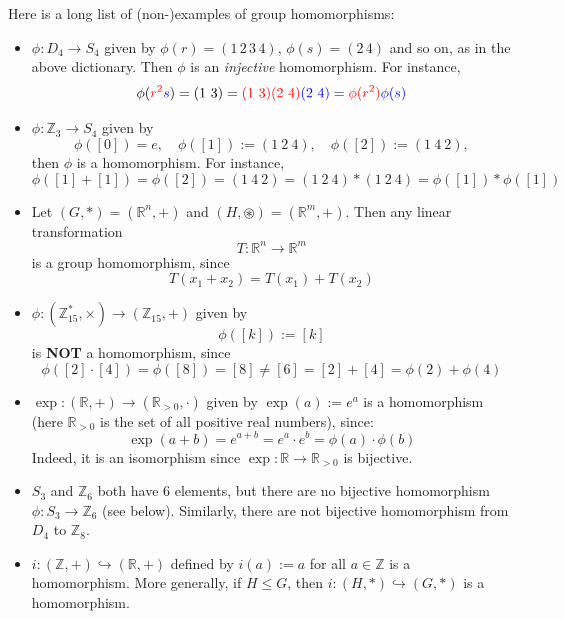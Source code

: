 \begin{example}
Here is a long list of (non-)examples of group homomorphisms:
\begin{itemize}
    \item $\phi : D_4 \to S_4$ given by $\phi(r) = (1\,2\,3\,4)$, $\phi(s) = (2\,4)$ and so on, as in the above dictionary. Then $\phi$ is an \textit{injective} homomorphism. For instance, 
    $$\phi({\color{red} r^2} {\color{blue} s}) = (1\ 3) = {\color{red} (1\ 3)(2\ 4)} {\color{blue} (2\ 4)} = {\color{red} \phi(r^2)} {\color{blue} \phi(s)}$$
    
    \item $\phi : \mathbb{Z}_3  \to S_4$ given by 
    $$\phi([0])=e,\quad \phi([1]) := (1\ 2 \ 4),\quad \phi([2]) :=(1\ 4\ 2),$$
    then $\phi$ is a homomorphism. For instance, 
    $$\phi([1] + [1]) = \phi([2]) = (1\ 4\ 2) = (1\ 2\ 4) \ast (1\ 2\ 4) = \phi([1]) \ast \phi([1])$$
    
    \item Let $(G, \ast) = (\mathbb{R}^n, +)$ and $(H, \circledast) = (\mathbb{R}^m, +)$. Then any linear transformation 
    $$T : \mathbb{R}^n \to \mathbb{R}^m$$ 
    is a group homomorphism, since
    $$T(x_1 + x_2) = T(x_1) + T(x_2)$$
    
    \item $\phi : (\mathbb{Z}_{15}^*, \times) \to (\mathbb{Z}_{15}, +)$ given by 
    $$\phi([k]) := [k]$$ 
    is \textbf{NOT} a homomorphism, since
    $$\phi([2] \cdot [4]) = \phi([8]) = [8] \neq [6] =[2] + [4] = \phi(2) + \phi(4)$$
    
    \item $\exp : (\mathbb{R}, +) \to (\mathbb{R}_{> 0}, \cdot)$ given by $\exp(a) := e^a$ is a homomorphism (here $\mathbb{R}_{> 0}$ is the set of all positive real numbers), since:
    $$\exp(a+b) = e^{a+b} = e^a \cdot e^b = \phi(a) \cdot \phi(b)$$
    Indeed, it is an isomorphism since $\exp: \mathbb{R} \to \mathbb{R}_{>0}$ is bijective.
    
    \item $S_3$ and $\mathbb{Z}_6$ both have 6 elements, but there are no bijective homomorphism $\phi: S_3 \to \mathbb{Z}_6$ (see below). Similarly, there are not bijective homomorphism from $D_4$ to $\mathbb{Z}_8$.
    
    \item $i : (\mathbb{Z}, +) \hookrightarrow (\mathbb{R}, +)$ defined by $i(a) := a$ for all $a \in \mathbb{Z}$ is a homomorphism. More generally, if $H \le G$, then $i : (H, \ast) \hookrightarrow (G, \ast)$ is a homomorphism.
    

\end{itemize}
\end{example}
